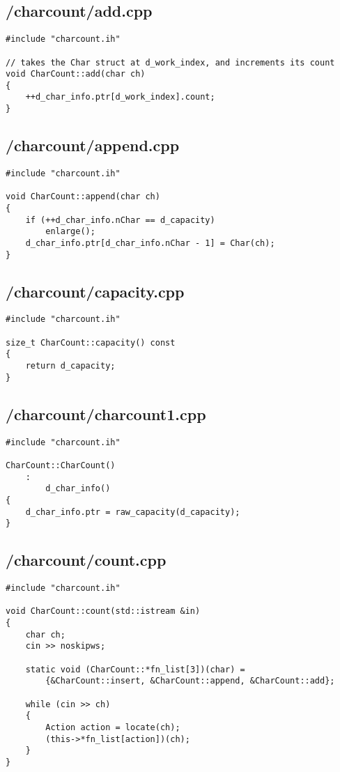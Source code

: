 \documentclass{article}
\begin{document}
\subsection*{/charcount/add.cpp}
\begin{verbatim}
#include "charcount.ih"

// takes the Char struct at d_work_index, and increments its count
void CharCount::add(char ch)
{
    ++d_char_info.ptr[d_work_index].count;
}
\end{verbatim}
\subsection*{/charcount/append.cpp}
\begin{verbatim}
#include "charcount.ih"

void CharCount::append(char ch)
{
    if (++d_char_info.nChar == d_capacity)
        enlarge();
    d_char_info.ptr[d_char_info.nChar - 1] = Char(ch);
}

\end{verbatim}
\subsection*{/charcount/capacity.cpp}
\begin{verbatim}
#include "charcount.ih"

size_t CharCount::capacity() const
{
    return d_capacity;
}
\end{verbatim}
\subsection*{/charcount/charcount1.cpp}
\begin{verbatim}
#include "charcount.ih"

CharCount::CharCount()
    :
        d_char_info()
{
    d_char_info.ptr = raw_capacity(d_capacity); 
}
\end{verbatim}
\subsection*{/charcount/count.cpp}
\begin{verbatim}
#include "charcount.ih"

void CharCount::count(std::istream &in)
{
    char ch;
    cin >> noskipws;

    static void (CharCount::*fn_list[3])(char) = 
        {&CharCount::insert, &CharCount::append, &CharCount::add};

    while (cin >> ch)
    {
        Action action = locate(ch);
        (this->*fn_list[action])(ch);
    }
}

\end{verbatim}
\end{document}
